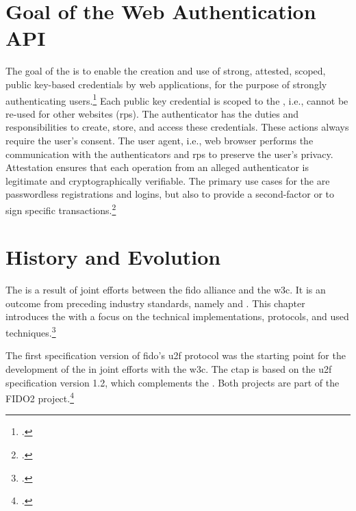 \section{Goal of the Web Authentication API}

The goal of the \wa{} is to enable \frqq the creation and use of strong, attested, scoped, public key-based credentials by web applications, for the purpose of strongly authenticating users\flqq.\footcites[][Abstract]{w3c} Each public key credential is scoped to the , i.e., cannot be re-used for other websites (\glspl{rp}). The authenticator has the duties and responsibilities to create, store, and access these credentials. These actions always require the user's consent. The user agent, i.e., web browser performs the communication with the authenticators and \glspl{rp} to preserve the user's privacy. Attestation ensures that each operation from an alleged authenticator is legitimate and cryptographically verifiable. The primary use cases for the \wa{} are passwordless registrations and logins, but also to provide a second-factor or to sign specific transactions.\footcites[See][Abstract, Chapter 1.2]{w3c}

\section{History and Evolution}

The \wa{} is a result of joint efforts between	 the \gls{fido} alliance and the \gls{w3c}. It is an outcome from preceding industry standards, namely  and . This chapter introduces the \wa{} with a focus on the technical implementations, protocols, and used techniques.\footcites[See][24]{fido-ct-3}

The first specification version of \gls{fido}'s \gls{u2f} protocol was the starting point for the development of the \wa{} in joint efforts with the \gls{w3c}. The \gls{ctap} is based on the \gls{u2f} specification version 1.2, which complements the \wa. Both projects are part of the FIDO2 project.\footcite[See][169--170]{grimes2017hacking}
